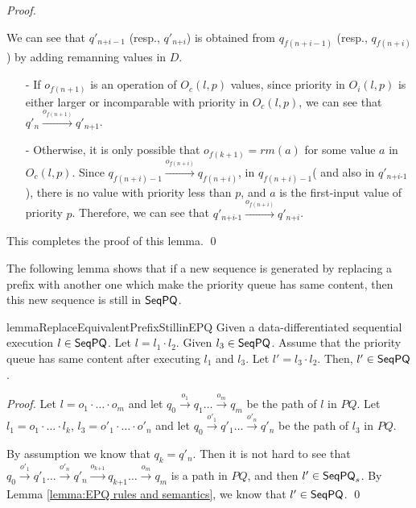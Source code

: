 \begin {proof}
\begin{itemize}
     We can see that $q'_{\textit{n+i}-1}$ (resp., $q'_{\textit{n+i}}$) is obtained from $q_{f(n+i-1)}$ (resp., $q_{f(n+i)}$) by adding remanning values in $D$.

    \begin{itemize}
    \setlength{\itemsep}{0.5pt}
    \item[-] If $o_{f(n+1)}$ is an operation of $O_c(l,p)$ values, since priority in $O_i(l,p)$ is either larger or incomparable with priority in $O_c(l,p)$, we can see that $q'_n \xrightarrow{o_{f(n+1)}} q'_{\textit{n+1}}$.

    \item[-] Otherwise, it is only possible that $o_{f(k+1)} = \textit{rm}(a)$ for some value $a$ in $O_c(l,p)$. Since $q_{f(n+i)-1} \xrightarrow{o_{f(n+i)}} q_{f(n+i)}$, in $q_{f(n+i)-1}$( and also in $q'_{\textit{n+i-1}}$), there is no value with priority less than $p$, and $a$ is the first-input value of priority $p$. Therefore, we can see that $q'_{\textit{n+i-1}} \xrightarrow{o_{f(n+i)}} q'_{\textit{n+i}}$.
    \end{itemize}
\end{itemize}

This completes the proof of this lemma. \qed
\end {proof}

The following lemma shows that if a new sequence is generated by replacing a prefix with another one which make the priority queue has same content, then this new sequence is still in $\mathsf{SeqPQ}$.

\begin{restatable}{lemma}{ReplaceEquivalentPrefixStillinEPQ}
\label{lemma:replace equivalent prefix still in EPQ}
Given a data-differentiated sequential execution $l \in \mathsf{SeqPQ}$. Let $l=l_1 \cdot l_2$. Given $l_3 \in \mathsf{SeqPQ}$. Assume that the priority queue has same content after executing $l_1$ and $l_3$. Let $l' = l_3 \cdot l_2$. Then, $l' \in \mathsf{SeqPQ}$.
\end{restatable}

\begin {proof}
Let $l=o_1 \cdot \ldots \cdot o_m$ and let $q_0 \xrightarrow{o_1} q_1 \ldots \xrightarrow{o_m} q_m$ be the path of $l$ in $\textit{PQ}$. Let $l_1 = o_1 \cdot \ldots \cdot l_k$, $l_3 = o'_1 \cdot \ldots \cdot o'_n$ and let $q_0 \xrightarrow{o'_1} q'_1 \ldots \xrightarrow{o'_n} q'_n$ be the path of $l_3$ in $\textit{PQ}$.

By assumption we know that $q_k = q'_n$. Then it is not hard to see that $q_0 \xrightarrow{o'_1} q'_1 \ldots \xrightarrow{o'_n} q'_n \xrightarrow{o_{\textit{k+1}}} q_{\textit{k+1}} \ldots \xrightarrow{o_m} q_m$ is a path in $\textit{PQ}$, and then $l' \in \mathsf{SeqPQ}_s$. By Lemma \ref{lemma:EPQ rules and semantics}, we know that $l' \in \mathsf{SeqPQ}$. \qed
\end {proof}




